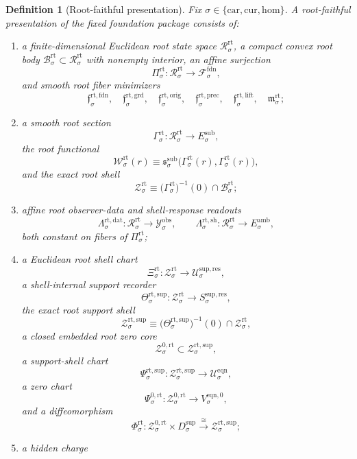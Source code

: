 \documentclass[11pt]{article}
\newcommand{\Car}{\mathrm{car}}
\newcommand{\Cur}{\mathrm{cur}}
\newcommand{\Hom}{\mathrm{hom}}
\newcommand{\DataSpace}[1]{\mathcal Y_{#1}^{\mathrm{obs}}}
\newcommand{\AmbientTarget}[1]{E_{#1}^{\mathrm{amb}}}
\newcommand{\SubTarget}[1]{E_{#1}^{\mathrm{sub}}}
\newcommand{\SubPair}[1]{\mathfrak s_{#1}^{\mathrm{sub}}}
\newcommand{\FoundSpace}[1]{\mathcal F_{#1}^{\mathrm{fdn}}}
\newcommand{\RootSpace}[1]{\mathcal R_{#1}^{\mathrm{rt}}}
\newcommand{\RootBody}[1]{\mathcal B_{#1}^{\mathrm{rt}}}
\newcommand{\RootProj}[1]{\Pi_{#1}^{\mathrm{rt}}}
\newcommand{\RootFoundMin}[1]{\mathfrak f_{#1}^{\mathrm{rt,fdn}}}
\newcommand{\RootGroundMin}[1]{\mathfrak f_{#1}^{\mathrm{rt,grd}}}
\newcommand{\RootOrigMin}[1]{\mathfrak f_{#1}^{\mathrm{rt,orig}}}
\newcommand{\RootPrecMin}[1]{\mathfrak f_{#1}^{\mathrm{rt,prec}}}
\newcommand{\RootLiftMin}[1]{\mathfrak f_{#1}^{\mathrm{rt,lift}}}
\newcommand{\RootSubMin}[1]{\mathfrak m_{#1}^{\mathrm{rt}}}
\newcommand{\RootSection}[1]{\Gamma_{#1}^{\mathrm{rt}}}
\newcommand{\RootFunctional}[1]{\mathscr W_{#1}^{\mathrm{rt}}}
\newcommand{\RootData}[1]{\Lambda_{#1}^{\mathrm{rt,dat}}}
\newcommand{\RootShellMap}[1]{\Lambda_{#1}^{\mathrm{rt,sh}}}
\newcommand{\RootShellSet}[1]{\mathcal Z_{#1}^{\mathrm{rt}}}
\newcommand{\RootChart}[1]{\Xi_{#1}^{\mathrm{rt}}}
\newcommand{\RootSupport}[1]{\Theta_{#1}^{\mathrm{rt,sup}}}
\newcommand{\RootSupportShell}[1]{\mathcal Z_{#1}^{\mathrm{rt,sup}}}
\newcommand{\RootZeroCore}[1]{\mathcal Z_{#1}^{0,\mathrm{rt}}}
\newcommand{\RootEqChart}[1]{\Psi_{#1}^{\mathrm{rt,sup}}}
\newcommand{\RootZeroChart}[1]{\Psi_{#1}^{0,\mathrm{rt}}}
\newcommand{\RootSplit}[1]{\Phi_{#1}^{\mathrm{rt}}}
\newcommand{\ResSpace}[1]{\mathcal U_{#1}^{\mathrm{sup,res}}}
\newcommand{\ResTarget}[1]{S_{#1}^{\mathrm{sup,res}}}
\newcommand{\SeedHiddenBody}[1]{D_{#1}^{\mathrm{sup}}}
\newcommand{\EqnSpace}[1]{\mathcal U_{#1}^{\mathrm{eqn}}}
\newcommand{\EqnZero}[1]{V_{#1}^{\mathrm{eqn},0}}
\newtheorem{definition}{Definition}
\begin{document}
\begin{definition}[Root-faithful presentation]
\label{def:faithful}
Fix \(\sigma\in\{\Car,\Cur,\Hom\}\). A \emph{root-faithful presentation} of the fixed foundation package consists of:
\begin{enumerate}
    \item a finite-dimensional Euclidean root state space \(\RootSpace{\sigma}\), a compact convex root body \(\RootBody{\sigma}\subset\RootSpace{\sigma}\) with nonempty interior, an affine surjection
    \[
    \RootProj{\sigma}:\RootSpace{\sigma}\to\FoundSpace{\sigma},
    \]
    and smooth root fiber minimizers
    \[
    \RootFoundMin{\sigma},\quad
    \RootGroundMin{\sigma},\quad
    \RootOrigMin{\sigma},\quad
    \RootPrecMin{\sigma},\quad
    \RootLiftMin{\sigma},\quad
    \RootSubMin{\sigma};
    \]
    \item a smooth root section
    \[
    \RootSection{\sigma}:\RootSpace{\sigma}\to\SubTarget{\sigma},
    \]
    the root functional
    \[
    \RootFunctional{\sigma}(r)
    \equiv
    \SubPair{\sigma}\bigl(\RootSection{\sigma}(r),\RootSection{\sigma}(r)\bigr),
    \]
    and the exact root shell
    \[
    \RootShellSet{\sigma}
    \equiv
    \bigl(\RootSection{\sigma}\bigr)^{-1}(0)\cap\RootBody{\sigma};
    \]
    \item affine root observer-data and shell-response readouts
    \[
    \RootData{\sigma}:\RootSpace{\sigma}\to\DataSpace{\sigma},
    \qquad
    \RootShellMap{\sigma}:\RootSpace{\sigma}\to\AmbientTarget{\sigma},
    \]
    both constant on fibers of \(\RootProj{\sigma}\);
    \item a Euclidean root shell chart
    \[
    \RootChart{\sigma}:\RootShellSet{\sigma}\to\ResSpace{\sigma},
    \]
    a shell-internal support recorder
    \[
    \RootSupport{\sigma}:\RootShellSet{\sigma}\to\ResTarget{\sigma},
    \]
    the exact root support shell
    \[
    \RootSupportShell{\sigma}
    \equiv
    \bigl(\RootSupport{\sigma}\bigr)^{-1}(0)\cap\RootShellSet{\sigma},
    \]
    a closed embedded root zero core
    \[
    \RootZeroCore{\sigma}\subset\RootSupportShell{\sigma},
    \]
    a support-shell chart
    \[
    \RootEqChart{\sigma}:\RootSupportShell{\sigma}\to\EqnSpace{\sigma},
    \]
    a zero chart
    \[
    \RootZeroChart{\sigma}:\RootZeroCore{\sigma}\to\EqnZero{\sigma},
    \]
    and a diffeomorphism
    \[
    \RootSplit{\sigma}:
    \RootZeroCore{\sigma}\times\SeedHiddenBody{\sigma}
    \xrightarrow{\cong}
    \RootSupportShell{\sigma};
    \]
    \item a hidden charge

\end{enumerate}
\end{definition}
\end{document}
